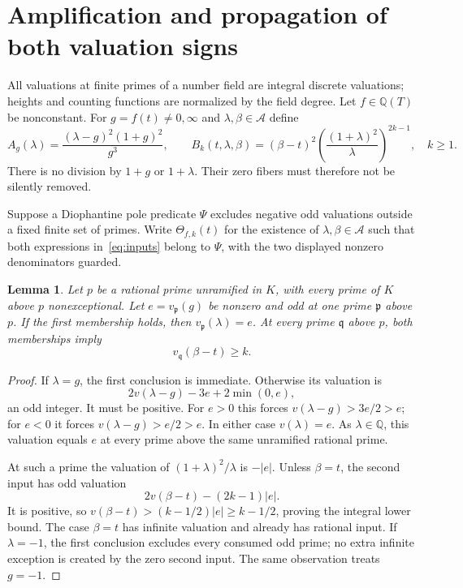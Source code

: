 \documentclass[11pt,a4paper]{article}
\newtheorem{lemma}[theorem]{Lemma}
\newcommand{\Q}{\mathbb Q}\newcommand{\Z}{\mathbb Z}
\begin{document}
\section{Amplification and propagation of both valuation signs}

All valuations at finite primes of a number field are integral discrete
valuations; heights and counting functions are normalized by the field
degree. Let $f\in\Q(T)$ be nonconstant. For $g=f(t)\ne0,\infty$ and
$\lambda,\beta\in\mathcal A$ define
\begin{equation}\label{eq:inputs}
 A_g(\lambda)=\frac{(\lambda-g)^2(1+g)^2}{g^3},\qquad
 B_k(t,\lambda,\beta)
 =(\beta-t)^2\left(\frac{(1+\lambda)^2}{\lambda}\right)^{2k-1},
 \quad k\ge1.
\end{equation}
There is no division by $1+g$ or $1+\lambda$. Their zero fibers must
therefore not be silently removed.

Suppose a Diophantine pole predicate $\Psi$ excludes negative odd
valuations outside a fixed finite set of primes. Write $\Theta_{f,k}(t)$
for the existence of $\lambda,\beta\in\mathcal A$ such that both
expressions in~\eqref{eq:inputs} belong to $\Psi$, with the two displayed
nonzero denominators guarded.

\begin{lemma}\label{lem:local}
Let $p$ be a rational prime unramified in $K$, with every prime of $K$
above $p$ nonexceptional. Let $e=v_{\mathfrak p}(g)$ be nonzero and odd
at one prime $\mathfrak p$ above $p$.
If the first membership holds, then $v_{\mathfrak p}(\lambda)=e$.
At every prime $\mathfrak q$ above $p$,
both memberships imply
\[
             v_{\mathfrak q}(\beta-t)\ge k.
\]
\end{lemma}
\begin{proof}
If $\lambda=g$, the first conclusion is immediate. Otherwise its
valuation is
\[
 2v(\lambda-g)-3e+2\min(0,e),
\]
an odd integer. It must be positive. For $e>0$ this forces
$v(\lambda-g)>3e/2>e$; for $e<0$ it forces
$v(\lambda-g)>e/2>e$. In either case $v(\lambda)=e$.
As $\lambda\in\Q$, this valuation equals $e$ at every prime above
the same unramified rational prime.

At such a prime the valuation of $(1+\lambda)^2/\lambda$ is $-|e|$.
Unless $\beta=t$, the second input has odd valuation
\[
        2v(\beta-t)-(2k-1)|e|.
\]
It is positive, so $v(\beta-t)>(k-1/2)|e|\ge k-1/2$, proving
the integral lower bound. The case $\beta=t$ has infinite valuation
and already has rational input. If $\lambda=-1$, the first conclusion
excludes every consumed odd prime; no extra infinite exception is
created by the zero second input. The same observation treats $g=-1$.
\end{proof}
\end{document}
